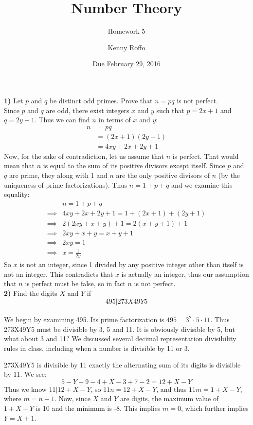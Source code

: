 \documentclass{scrartcl}
\title{Number Theory}
\subtitle{Homework 5}
\author{Kenny Roffo}
\date{Due February 29, 2016}
\begin{document}
\maketitle

\textbf{1)} Let $p$ and $q$ be distinct odd primes. Prove that $n=pq$ is not perfect.\\

Since $p$ and $q$ are odd, there exist integers $x$ and $y$ such that $p=2x+1$ and $q=2y+1$. Thus we can find $n$ in terms of $x$ and $y$:
\begin{align*}
  n &= pq\\
  &= (2x+1)(2y+1)\\
  &= 4xy+2x+2y+1
\end{align*}
Now, for the sake of contradiction, let us assume that $n$ is perfect. That would mean that $n$ is equal to the sum of its positive divisors except itself. Since $p$ and $q$ are prime, they along with 1 and $n$ are the only positive divisors of $n$ (by the uniqueness of prime factorizations). Thus $n=1 + p + q$ and we examine this equality:
\begin{align*}
  &n = 1 + p + q\\
  \implies &4xy+2x+2y+1 = 1 + (2x+1) + (2y+1)\\
  \implies &2(2xy+x+y) + 1 = 2(x + y + 1) + 1\\
  \implies &2xy+x+y = x+y+1\\
  \implies &2xy = 1\\
  \implies & x = \frac{1}{2y}
\end{align*}
So $x$ is not an integer, since 1 divided by any positive integer other than itself is not an integer. This contradicts that $x$ is actually an integer, thus our assumption that $n$ is perfect must be false, so in fact $n$ is not perfect.\\

\textbf{2)} Find the digits $X$ and $Y$ if $$495 | 273X49Y5$$\\

We begin by examining 495. Its prime factorization is $495=3^2\cdot5\cdot11$. Thus 273X49Y5 must be divisible by 3, 5 and 11. It is obviously divisible by 5, but what about 3 and 11? We discussed several decimal representation divisibility rules in class, including when a number is divisible by 11 or 3. 

273X49Y5 is divisible by 11 exactly the alternating sum of its digits is divisible by 11. We see:
$$ 5-Y+9-4+X-3+7-2 = 12 + X - Y $$
Thus we know $11 | 12 + X - Y$, so $11n = 12 + X - Y$, and thus $11m = 1 + X - Y$, where $m=n-1$. Now, since $X$ and $Y$ are digits, the maximum value of $1 + X - Y$ is 10 and the minimum is -8. This implies $m=0$, which further implies $Y=X+1$.
\end{document}
